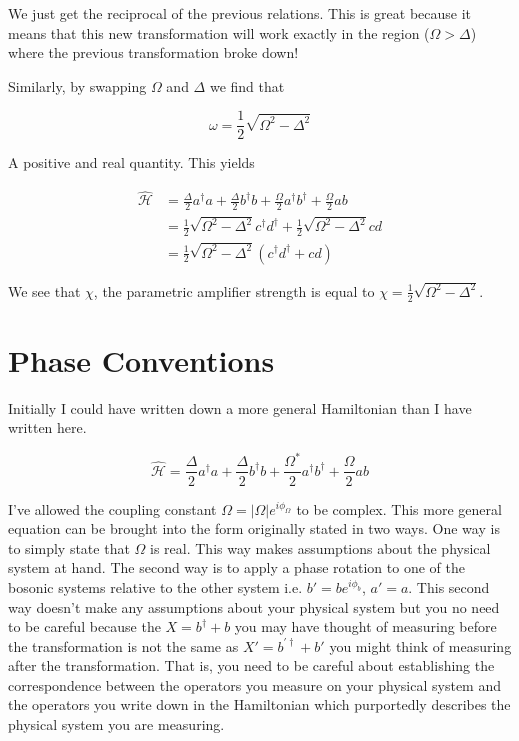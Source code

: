 \documentclass[12pt]{article}
\begin{document}
We just get the reciprocal of the previous relations. This is great because it means that this new transformation will work exactly in the region ($\Omega>\Delta$) where the previous transformation broke down!

Similarly, by swapping $\Omega$ and $\Delta$ we find that 

\[\omega = \frac{1}{2} \sqrt{\Omega^2-\Delta^2}\]

A positive and real quantity. This yields

\begin{align}
\hat{\mathcal{H}} &= \frac{\Delta}{2} a^{\dagger}a + \frac{\Delta}{2} b^\dag b + \frac{\Omega}{2} a^\dag b^{\dag} + \frac{\Omega}{2} ab\\
&= \frac{1}{2} \sqrt{\Omega^2-\Delta^2} c^{\dag}d^{\dag} + \frac{1}{2} \sqrt{\Omega^2-\Delta^2} cd\\
&= \frac{1}{2} \sqrt{\Omega^2-\Delta^2} (c^{\dag}d^{\dag} + cd)
\end{align}

We see that $\chi$, the parametric amplifier strength is equal to $\chi =\frac{1}{2}\sqrt{\Omega^2-\Delta^2}$.

\section{Phase Conventions}

Initially I could have written down a more general Hamiltonian than I have written here.

\[
\hat{\mathcal{H}} = \frac{\Delta}{2}a^{\dag}a + \frac{\Delta}{2}b^{\dag}b + \frac{\Omega^*}{2} a^{\dag} b^{\dag} + \frac{\Omega}{2} ab
\]

I've allowed the coupling constant $\Omega = |\Omega|e^{i \phi_{\Omega}}$ to be complex. This more general equation can be brought into the form originally stated in two ways. One way is to simply state that $\Omega$ is real. This way makes assumptions about the physical system at hand. The second way is to apply a phase rotation to one of the bosonic systems relative to the other system i.e. $b' = b e^{i\phi_b}$, $a'= a$. This second way doesn't make any assumptions about your physical system but you no need to be careful because the $X=b^{\dag}+b$ you may have thought of measuring before the transformation is not the same as $X' = b^{'\dag}+b'$ you might think of measuring after the transformation. That is, you need to be careful about establishing the correspondence between the operators you measure on your physical system and the operators you write down in the Hamiltonian which purportedly describes the physical system you are measuring.
\end{document}
